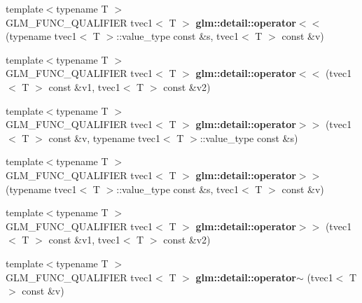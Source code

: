 \begin{DoxyCompactItemize}
\item 
\hypertarget{namespaceglm_1_1detail_a9160216c3c05c934418e4682a8cf71dc}{{\footnotesize template$<$typename T $>$ }\\G\-L\-M\-\_\-\-F\-U\-N\-C\-\_\-\-Q\-U\-A\-L\-I\-F\-I\-E\-R tvec1$<$ T $>$ {\bfseries glm\-::detail\-::operator$<$$<$} (typename tvec1$<$ T $>$\-::value\-\_\-type const \&s, tvec1$<$ T $>$ const \&v)}\label{namespaceglm_1_1detail_a9160216c3c05c934418e4682a8cf71dc}

\item 
\hypertarget{namespaceglm_1_1detail_a795144a1721352dd8ec35087e0cb9ff4}{{\footnotesize template$<$typename T $>$ }\\G\-L\-M\-\_\-\-F\-U\-N\-C\-\_\-\-Q\-U\-A\-L\-I\-F\-I\-E\-R tvec1$<$ T $>$ {\bfseries glm\-::detail\-::operator$<$$<$} (tvec1$<$ T $>$ const \&v1, tvec1$<$ T $>$ const \&v2)}\label{namespaceglm_1_1detail_a795144a1721352dd8ec35087e0cb9ff4}

\item 
\hypertarget{namespaceglm_1_1detail_ad6c1e015a661e377bbc6dd97543d44fe}{{\footnotesize template$<$typename T $>$ }\\G\-L\-M\-\_\-\-F\-U\-N\-C\-\_\-\-Q\-U\-A\-L\-I\-F\-I\-E\-R tvec1$<$ T $>$ {\bfseries glm\-::detail\-::operator$>$$>$} (tvec1$<$ T $>$ const \&v, typename tvec1$<$ T $>$\-::value\-\_\-type const \&s)}\label{namespaceglm_1_1detail_ad6c1e015a661e377bbc6dd97543d44fe}

\item 
\hypertarget{namespaceglm_1_1detail_abe562021ea02757230c507dcec64e280}{{\footnotesize template$<$typename T $>$ }\\G\-L\-M\-\_\-\-F\-U\-N\-C\-\_\-\-Q\-U\-A\-L\-I\-F\-I\-E\-R tvec1$<$ T $>$ {\bfseries glm\-::detail\-::operator$>$$>$} (typename tvec1$<$ T $>$\-::value\-\_\-type const \&s, tvec1$<$ T $>$ const \&v)}\label{namespaceglm_1_1detail_abe562021ea02757230c507dcec64e280}

\item 
\hypertarget{namespaceglm_1_1detail_ac0a8c77debb2d3be29d2f966a35b8f29}{{\footnotesize template$<$typename T $>$ }\\G\-L\-M\-\_\-\-F\-U\-N\-C\-\_\-\-Q\-U\-A\-L\-I\-F\-I\-E\-R tvec1$<$ T $>$ {\bfseries glm\-::detail\-::operator$>$$>$} (tvec1$<$ T $>$ const \&v1, tvec1$<$ T $>$ const \&v2)}\label{namespaceglm_1_1detail_ac0a8c77debb2d3be29d2f966a35b8f29}

\item 
\hypertarget{namespaceglm_1_1detail_a6c38630bb9e02cd25d464e0fffc0e0cc}{{\footnotesize template$<$typename T $>$ }\\G\-L\-M\-\_\-\-F\-U\-N\-C\-\_\-\-Q\-U\-A\-L\-I\-F\-I\-E\-R tvec1$<$ T $>$ {\bfseries glm\-::detail\-::operator$\sim$} (tvec1$<$ T $>$ const \&v)}\label{namespaceglm_1_1detail_a6c38630bb9e02cd25d464e0fffc0e0cc}

\end{DoxyCompactItemize}


